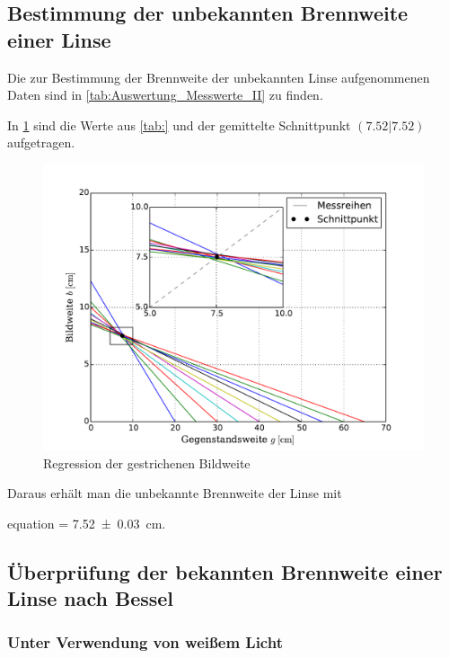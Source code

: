 	  
\subsection{Bestimmung der unbekannten Brennweite einer Linse}
	
	Die zur Bestimmung der Brennweite der unbekannten Linse aufgenommenen Daten sind in 
	\cref{tab:Auswertung_Messwerte_II} zu finden.
	
	 
	
	In \cref{fig:Auswertung_UnbekannteLinse} sind die Werte aus \cref{tab:} und der gemittelte Schnittpunkt
	$(7.52|7.52)$ aufgetragen.
	
	\begin{figure}[!h]
		\centering
		\includegraphics[scale=.7]{Grafiken/Messwerte_Unbekannt.pdf}
		\caption{Regression der gestrichenen Bildweite\label{fig:Auswertung_UnbekannteLinse}}
	\end{figure}  
	
	
	Daraus erhält man die unbekannte Brennweite der Linse mit 
	 \begin{empheq}{equation}
			\label{val:Auswertung_Unbekannt}
			 = \SI{7.52(3)}{\centi\meter}.
	 \end{empheq}
	

\subsection{Überprüfung der bekannten Brennweite einer Linse nach Bessel}

	\subsubsection{Unter Verwendung von weißem Licht}
	
